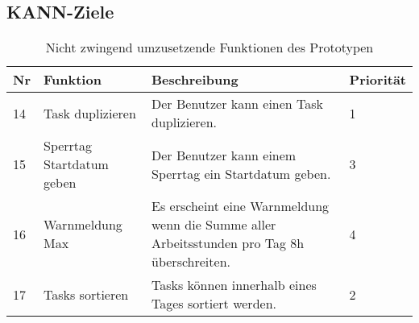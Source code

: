 \subsection{KANN-Ziele}
\begin{table}[!ht]
\begin{center}
    \begin{tabular}{llp{8cm}l}
        \toprule Nr & Funktion & Beschreibung & Priorität \\
        \midrule 14 & Task duplizieren & Der Benutzer kann einen Task duplizieren. & 1\\
        \midrule 15 & Sperrtag Startdatum geben & Der Benutzer kann einem Sperrtag ein Startdatum geben. &  3\\ 
        \midrule 16 & Warnmeldung Max & Es erscheint eine Warnmeldung wenn die Summe aller Arbeitsstunden pro Tag 8h überschreiten. & 4\\
        \midrule 17 & Tasks sortieren & Tasks können innerhalb eines Tages sortiert werden. & 2\\
        \bottomrule
    \end{tabular}
    \caption{Nicht zwingend umzusetzende Funktionen des Prototypen}
    \label{tab:kann_funktionen}
\end{center}
\end{table}

% 
